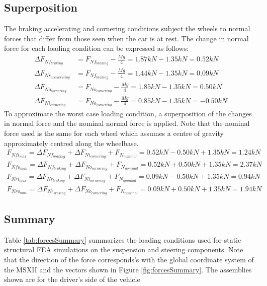 \documentclass[12pt]{article}
\begin{document}
\subsection{Superposition}
The braking accelerating and cornering conditions subject the wheels to normal forces that differ from those seen when the car is at rest. The change in normal force for each loading condition can be expressed as follows: 
\begin{equation}
	\begin{split}
		\Delta F_{Nf_{braking}} &= F_{Nf_{braking}} - \frac{Mg}{4} =  1.87kN - 1.35kN = 0.52kN\\
		\Delta F_{Nr_{accelerating}} &= F_{Nf_{braking}} - \frac{Mg}{4} =  1.44kN - 1.35kN = 0.09kN\\
		\Delta F_{No_{cornering}} &=  F_{No_{cornering}} - \frac{Mg}{4} =  1.85kN - 1.35kN = 0.50kN \\
		\Delta F_{Ni_{cornering}} &=  F_{No_{cornering}} - \frac{Mg}{4} =  0.85kN - 1.35kN = -0.50kN
	\end{split}
\end{equation}
To approximate the worst case loading condition, a superposition of the changes in normal force and the nominal normal force is applied. Note that the nominal force used is the same for each wheel which assumes a centre of gravity approximately centred along the wheelbase.   
\begin{equation}
	\begin{split}	
	F_{Nfi_{max}} = \Delta F_{Nf_{braking}} + \Delta F_{Ni_{cornering}} + F_{N_{nominal}} = 0.52kN - 0.50kN + 1.35kN = 1.24kN \\
	F_{Nfo_{max}} = \Delta F_{Nf_{braking}} + \Delta F_{No_{cornering}} + F_{N_{nominal}} = 0.52kN + 0.50kN + 1.35kN = 2.37kN \\
	F_{Nri_{max}} = \Delta F_{Nr_{braking}} + \Delta F_{Ni_{cornering}} + F_{N_{nominal}} = 0.09kN - 0.50kN + 1.35kN = 0.94kN \\
	F_{Nro_{max}} = \Delta F_{Nr_{braking}} + \Delta F_{No_{cornering}} + F_{N_{nominal}} = 0.09kN + 0.50kN + 1.35kN = 1.94kN 
	\end{split}
\end{equation}

\subsection{Summary}
Table \ref{tab:forcesSummary} summarizes the loading conditions used for static structural FEA simulations on the suspension and steering components. Note that the direction of the force corresponds's with the global coordinate system of the MSXII and the vectors shown in Figure \ref{fig:forcesSummary}. The assemblies shown are for the driver's side of the vehicle
\end{document}
